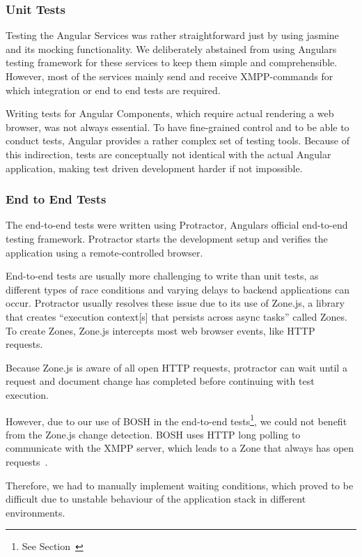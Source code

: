 \subsubsection{Unit Tests}

Testing the Angular Services was rather straightforward just by using jasmine and its mocking functionality.
We deliberately abstained from using Angulars testing framework for these services to keep them simple and comprehensible.
However, most of the services mainly send and receive XMPP-commands for which integration or end to end tests are required.

Writing tests for Angular Components, which require actual rendering a web browser, was not always essential.
To have fine-grained control and to be able to conduct tests, Angular provides a rather complex set of testing tools.
Because of this indirection, tests are conceptually not identical with the actual Angular application, making test driven development harder if not impossible.

\subsubsection{End to End Tests}

The end-to-end tests were written using Protractor, Angulars official end-to-end testing framework.
Protractor starts the development setup and verifies the application using a remote-controlled browser.

End-to-end tests are usually more challenging to write than unit tests, as different types of race conditions and varying delays to backend applications can occur.
Protractor usually resolves these issue due to its use of Zone.js, a library that creates ``execution context[s] that persists across async tasks'' called Zones.
To create Zones, Zone.js intercepts most web browser events, like HTTP requests.~\cite{zone-js-readme}

Because Zone.js is aware of all open HTTP requests, protractor can wait until a request and document change has completed before continuing with test execution.

However, due to our use of BOSH in the end-to-end tests\footnote{See Section~}, we could not benefit from the Zone.js change detection.
BOSH uses HTTP long polling to communicate with the XMPP server, which leads to a Zone that always has open requests~\cite{xep-0124}.

Therefore, we had to manually implement waiting conditions, which proved to be difficult due to unstable behaviour of the application stack in different environments.

